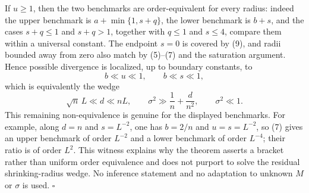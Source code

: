 If \(u\geq1\), then the two benchmarks are order-equivalent for every radius: indeed the upper benchmark is \(a+\min\{1,s+q\}\), the lower benchmark is \(b+s\), and the cases \(s+q\leq1\) and \(s+q>1\), together with \(q\leq1\) and \(s\leq4\), compare them within a universal constant.  The endpoint \(s=0\) is covered by (9), and radii bounded away from zero also match by (5)--(7) and the saturation argument.  Hence possible divergence is localized, up to boundary constants, to
\[
 b\ll u\ll1,
 \qquad
 b\ll s\ll1,
 \tag{11}
\]
which is equivalently the wedge
\[
 \sqrt n\,L\ll d\ll nL,
 \qquad
 \sigma^2\gg \frac1n+\frac d{n^2},
 \qquad
 \sigma^2\ll1.
\]
This remaining non-equivalence is genuine for the displayed benchmarks.  For example, along \(d=n\) and \(s=L^{-2}\), one has \(b=2/n\) and \(u=s=L^{-2}\), so (7) gives an upper benchmark of order \(L^{-2}\) and a lower benchmark of order \(L^{-4}\); their ratio is of order \(L^2\).  This witness explains why the theorem asserts a bracket rather than uniform order equivalence and does not purport to solve the residual shrinking-radius wedge.  No inference statement and no adaptation to unknown \(M\) or \(\sigma\) is used.  \(\square\)